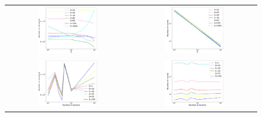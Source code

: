 \begin{figure}
\centering
\begin{tabular}{cc}
	\includegraphics[width=0.5\textwidth]{fig/speedupEpochsT-synthetic_logistic_regression_iclr300-epsilon07-b4-adapt0.pdf} & 
\includegraphics[width=0.5\textwidth]{fig/speedupEpochsRounds-synthetic_logistic_regression_iclr300-epsilon07-b4-adapt0.pdf} \\
	\includegraphics[width=0.5\textwidth]{fig/speedupNodesT-synthetic_logistic_regression_iclr300-epsilon07-b4-adapt0.pdf} & 
\includegraphics[width=0.5\textwidth]{fig/speedupNodesRounds-synthetic_logistic_regression_iclr300-epsilon07-b4-adapt0.pdf} \\

\end{tabular}
\end{figure}
